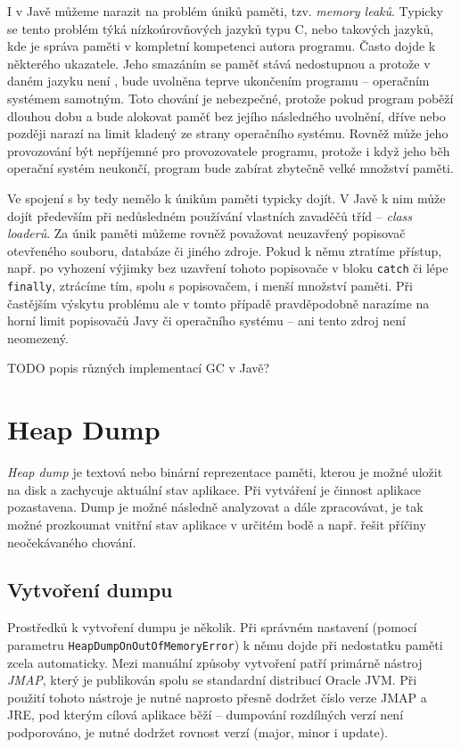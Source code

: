 I v Javě můžeme narazit na problém úniků paměti, tzv. \textit{memory leaků}. Typicky se tento problém týká nízkoúrovňových jazyků typu C, nebo takových jazyků, kde je správa paměti v kompletní kompetenci autora programu. Často dojde k  některého ukazatele. Jeho smazáním se paměť stává nedostupnou a protože v daném jazyku není , bude uvolněna teprve ukončením programu -- operačním systémem samotným. Toto chování je nebezpečné, protože pokud program poběží dlouhou dobu a bude alokovat paměť bez jejího následného uvolnění, dříve nebo později narazí na limit kladený ze strany operačního systému. Rovněž může jeho provozování být nepříjemné pro provozovatele programu, protože i když jeho běh operační systém neukončí, program bude zabírat zbytečně velké množství paměti.

Ve spojení s  by tedy nemělo k únikům paměti typicky dojít. V Javě k nim může dojít především při nedůsledném používání vlastních zavaděčů tříd -- \textit{class loaderů}. Za únik paměti můžeme rovněž považovat neuzavřený popisovač otevřeného souboru, databáze či jiného zdroje. Pokud k němu ztratíme přístup, např. po vyhození výjimky bez uzavření tohoto popisovače v bloku \texttt{catch} či lépe \texttt{finally}, ztrácíme tím, spolu s popisovačem, i menší množství paměti. Při častějším výskytu problému ale v tomto případě pravděpodobně narazíme na horní limit popisovačů Javy či operačního systému -- ani tento zdroj není neomezený.

TODO popis různých implementací GC v Javě?

\section{Heap Dump}
\textit{Heap dump} je textová nebo binární reprezentace paměti, kterou je možné uložit na disk a zachycuje aktuální stav aplikace. Při vytváření je činnost aplikace pozastavena. Dump je možné následně analyzovat a dále zpracovávat, je tak možné prozkoumat vnitřní stav aplikace v určitém bodě a např. řešit příčiny neočekávaného chování. 

\subsection{Vytvoření dumpu}
Prostředků k vytvoření dumpu je několik. Při správném nastavení (pomocí parametru \texttt{HeapDumpOnOutOfMemoryError}) k němu dojde při nedostatku paměti zcela automaticky. Mezi manuální způsoby vytvoření patří primárně nástroj \textit{JMAP}, který je publikován spolu se standardní distribucí Oracle JVM. Při použití tohoto nástroje je nutné naprosto přesně dodržet číslo verze JMAP a JRE, pod kterým cílová aplikace běží – dumpování rozdílných verzí není podporováno, je nutné dodržet rovnost verzí (major, minor i update).

